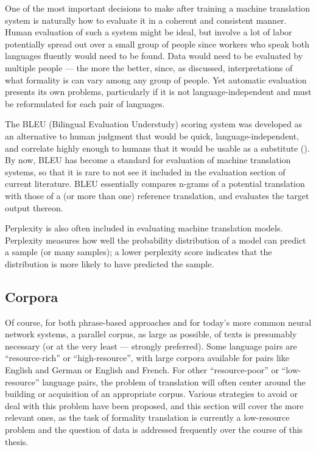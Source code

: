 One of the most important decisions to make after training a machine translation system is naturally how to evaluate it in a coherent and consistent manner. Human evaluation of such a system might be ideal, but involve a lot of labor potentially spread out over a small group of people since workers who speak both languages fluently would need to be found. Data would need to be evaluated by multiple people --- the more the better, since, as discussed, interpretations of what formality is can vary among any group of people. Yet automatic evaluation presents its own problems, particularly if it is not language-independent and must be reformulated for each pair of languages.

The BLEU (Bilingual Evaluation Understudy) scoring system was developed as an alternative to human judgment that would be quick, language-independent, and correlate highly enough to humans that it would be usable as a substitute (\cite{papineni2002bleu}). By now, BLEU has become a standard for evaluation of machine translation systems, so that it is rare to not see it included in the evaluation section of current literature. BLEU essentially compares n-grams of a potential translation with those of a (or more than one) reference translation, and evaluates the target output thereon. 

Perplexity is also often included in evaluating machine translation models. Perplexity measures how well the probability distribution of a model can predict a sample (or many samples); a lower perplexity score indicates that the distribution is more likely to have predicted the sample.

\subsection{Corpora}

Of course, for both phrase-based approaches and for today's more common neural network systems, a parallel corpus, as large as possible, of texts is presumably necessary (or at the very least --- strongly preferred). Some language pairs are ``resource-rich'' or ``high-resource'', with large corpora available for pairs like English and German or English and French. For other ``resource-poor'' or ``low-resource'' language pairs, the problem of translation will often center around the building or acquisition of an appropriate corpus. Various strategies to avoid or deal with this problem have been proposed, and this section will cover the more relevant ones, as the task of formality translation is currently a low-resource problem and the question of data is addressed frequently over the course of this thesis.

